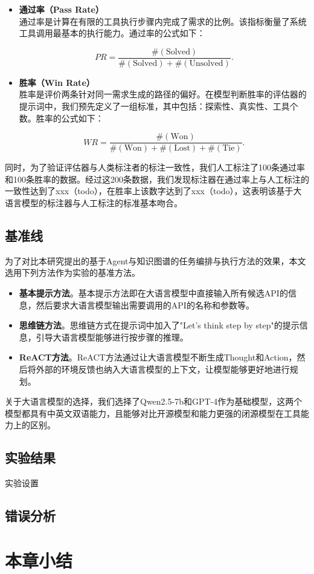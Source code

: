 \begin{itemize}
    \item \textbf{通过率（Pass Rate）} \\
    通过率是计算在有限的工具执行步骤内完成了需求的比例。该指标衡量了系统工具调用最基本的执行能力。通过率的公式如下：

    \begin{equation}
        PR = \frac{ \#(\text{Solved}) }{ \#(\text{Solved}) + \#(\text{Unsolved}) }.
    \end{equation}

    \item \textbf{胜率（Win Rate）} \\
    胜率是评价两条针对同一需求生成的路径的偏好。在模型判断胜率的评估器的提示词中，我们预先定义了一组标准，其中包括：探索性、真实性、工具个数。胜率的公式如下：

    \begin{equation}
        WR = \frac{ \#(\text{Won}) }{ \#(\text{Won}) + \#(\text{Lost}) + \#(\text{Tie}) }.
    \end{equation}

\end{itemize}

同时，为了验证评估器与人类标注者的标注一致性，我们人工标注了100条通过率和100条胜率的数据。经过这200条数据，我们发现标注器在通过率上与人工标注的一致性达到了xxx（todo），在胜率上该数字达到了xxx（todo），这表明该基于大语言模型的标注器与人工标注的标准基本吻合。

\subsection{基准线}

为了对比本研究提出的基于Agent与知识图谱的任务编排与执行方法的效果，本文选用下列方法作为实验的基准方法。

\begin{itemize}
  \item  \textbf{基本提示方法}。基本提示方法即在大语言模型中直接输入所有候选API的信息，然后要求大语言模型输出需要调用的API的名称和参数等。
  \item  \textbf{思维链方法}\cite{Wang2023}。思维链方式在提示词中加入了"Let's think step by step"的提示信息，引导大语言模型能够进行按步骤的推理。
  \item  \textbf{ReACT方法}\cite{Yao2023}。ReACT方法通过让大语言模型不断生成Thought和Action，然后将外部的环境反馈也纳入大语言模型的上下文，让模型能够更好地进行规划。
\end{itemize}
\indent

关于大语言模型的选择，我们选择了Qwen2.5-7b和GPT-4作为基础模型，这两个模型都具有中英文双语能力，且能够对比开源模型和能力更强的闭源模型在工具能力上的区别。

\subsection{实验结果}

实验设置

\label{subsec:exp_results}

\subsection{错误分析}
\label{subsec:error_analysis}


\section{本章小结}
\label{sec:summary_chap4}